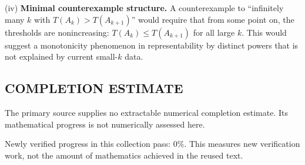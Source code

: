 \smallskip
\noindent (iv) \textbf{Minimal counterexample structure.}
A counterexample to ``infinitely many $k$ with $T(A_k)>T(A_{k+1})$'' would require that from some point on, the thresholds are nonincreasing: $T(A_k)\le T(A_{k+1})$ for all large $k$. This would suggest a monotonicity phenomenon in representability by distinct powers that is not explained by current small-$k$ data.




\subsection*{COMPLETION ESTIMATE}
The primary source supplies no extractable numerical completion estimate. Its mathematical progress is not numerically assessed here.

Newly verified progress in this collection pass: $0\%$. This measures new verification work, not the amount of mathematics achieved in the reused text.
